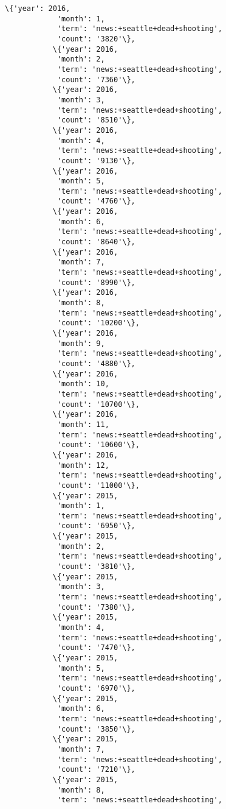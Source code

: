 \documentclass[11pt]{article}
\begin{document}
\begin{Verbatim}[commandchars=\\\{\}]
           \{'year': 2016,
            'month': 1,
            'term': 'news:+seattle+dead+shooting',
            'count': '3820'\},
           \{'year': 2016,
            'month': 2,
            'term': 'news:+seattle+dead+shooting',
            'count': '7360'\},
           \{'year': 2016,
            'month': 3,
            'term': 'news:+seattle+dead+shooting',
            'count': '8510'\},
           \{'year': 2016,
            'month': 4,
            'term': 'news:+seattle+dead+shooting',
            'count': '9130'\},
           \{'year': 2016,
            'month': 5,
            'term': 'news:+seattle+dead+shooting',
            'count': '4760'\},
           \{'year': 2016,
            'month': 6,
            'term': 'news:+seattle+dead+shooting',
            'count': '8640'\},
           \{'year': 2016,
            'month': 7,
            'term': 'news:+seattle+dead+shooting',
            'count': '8990'\},
           \{'year': 2016,
            'month': 8,
            'term': 'news:+seattle+dead+shooting',
            'count': '10200'\},
           \{'year': 2016,
            'month': 9,
            'term': 'news:+seattle+dead+shooting',
            'count': '4880'\},
           \{'year': 2016,
            'month': 10,
            'term': 'news:+seattle+dead+shooting',
            'count': '10700'\},
           \{'year': 2016,
            'month': 11,
            'term': 'news:+seattle+dead+shooting',
            'count': '10600'\},
           \{'year': 2016,
            'month': 12,
            'term': 'news:+seattle+dead+shooting',
            'count': '11000'\},
           \{'year': 2015,
            'month': 1,
            'term': 'news:+seattle+dead+shooting',
            'count': '6950'\},
           \{'year': 2015,
            'month': 2,
            'term': 'news:+seattle+dead+shooting',
            'count': '3810'\},
           \{'year': 2015,
            'month': 3,
            'term': 'news:+seattle+dead+shooting',
            'count': '7380'\},
           \{'year': 2015,
            'month': 4,
            'term': 'news:+seattle+dead+shooting',
            'count': '7470'\},
           \{'year': 2015,
            'month': 5,
            'term': 'news:+seattle+dead+shooting',
            'count': '6970'\},
           \{'year': 2015,
            'month': 6,
            'term': 'news:+seattle+dead+shooting',
            'count': '3850'\},
           \{'year': 2015,
            'month': 7,
            'term': 'news:+seattle+dead+shooting',
            'count': '7210'\},
           \{'year': 2015,
            'month': 8,
            'term': 'news:+seattle+dead+shooting',

\end{Verbatim}
\end{document}
